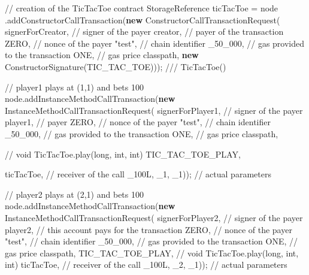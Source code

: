 \documentclass[a4paper,]{book}
\newenvironment{Shaded}{\begin{snugshade}}{\end{snugshade}}
\newcommand{\CommentTok}[1]{\textcolor[rgb]{0.54,0.53,0.53}{#1}}
\newcommand{\DecValTok}[1]{\textcolor[rgb]{0.69,0.50,0.00}{#1}}
\newcommand{\FunctionTok}[1]{\textcolor[rgb]{0.39,0.29,0.61}{#1}}
\newcommand{\KeywordTok}[1]{\textcolor[rgb]{0.12,0.11,0.11}{\textbf{#1}}}
\newcommand{\NormalTok}[1]{\textcolor[rgb]{0.12,0.11,0.11}{#1}}
\newcommand{\StringTok}[1]{\textcolor[rgb]{0.75,0.01,0.01}{#1}}
\renewenvironment{Shaded}{\begin{snugshade}\small}{\end{snugshade}}
\begin{document}
{\begin{Shaded}
\begin{Highlighting}[]
      \CommentTok{// creation of the TicTacToe contract}
\NormalTok{      StorageReference ticTacToe = node}
\NormalTok{        .}\FunctionTok{addConstructorCallTransaction}\NormalTok{(}\KeywordTok{new} \FunctionTok{ConstructorCallTransactionRequest}\NormalTok{(}
\NormalTok{          signerForCreator, }\CommentTok{// signer of the payer}
\NormalTok{          creator, }\CommentTok{// payer of the transaction}
\NormalTok{          ZERO, }\CommentTok{// nonce of the payer}
          \StringTok{"test"}\NormalTok{, }\CommentTok{// chain identifier}
\NormalTok{          _}\DecValTok{50_000}\NormalTok{, }\CommentTok{// gas provided to the transaction}
\NormalTok{          ONE, }\CommentTok{// gas price}
\NormalTok{          classpath,}
          \KeywordTok{new} \FunctionTok{ConstructorSignature}\NormalTok{(TIC_TAC_TOE))); }\CommentTok{/// TicTacToe()}

      \CommentTok{// player1 plays at (1,1) and bets 100}
\NormalTok{      node.}\FunctionTok{addInstanceMethodCallTransaction}\NormalTok{(}\KeywordTok{new} \FunctionTok{InstanceMethodCallTransactionRequest}\NormalTok{(}
\NormalTok{        signerForPlayer1, }\CommentTok{// signer of the payer}
\NormalTok{        player1, }\CommentTok{// payer}
\NormalTok{        ZERO, }\CommentTok{// nonce of the payer}
        \StringTok{"test"}\NormalTok{, }\CommentTok{// chain identifier}
\NormalTok{        _}\DecValTok{50_000}\NormalTok{, }\CommentTok{// gas provided to the transaction}
\NormalTok{        ONE, }\CommentTok{// gas price}
\NormalTok{        classpath,}

        \CommentTok{// void TicTacToe.play(long, int, int)}
\NormalTok{        TIC_TAC_TOE_PLAY,}

\NormalTok{        ticTacToe, }\CommentTok{// receiver of the call}
\NormalTok{        _}\DecValTok{100L}\NormalTok{, _}\DecValTok{1}\NormalTok{, _}\DecValTok{1}\NormalTok{)); }\CommentTok{// actual parameters}

      \CommentTok{// player2 plays at (2,1) and bets 100}
\NormalTok{      node.}\FunctionTok{addInstanceMethodCallTransaction}\NormalTok{(}\KeywordTok{new} \FunctionTok{InstanceMethodCallTransactionRequest}\NormalTok{(}
\NormalTok{        signerForPlayer2, }\CommentTok{// signer of the payer}
\NormalTok{        player2, }\CommentTok{// this account pays for the transaction}
\NormalTok{        ZERO, }\CommentTok{// nonce of the payer}
        \StringTok{"test"}\NormalTok{, }\CommentTok{// chain identifier}
\NormalTok{        _}\DecValTok{50_000}\NormalTok{, }\CommentTok{// gas provided to the transaction}
\NormalTok{        ONE, }\CommentTok{// gas price}
\NormalTok{        classpath,}
\NormalTok{        TIC_TAC_TOE_PLAY, }\CommentTok{// void TicTacToe.play(long, int, int)}
\NormalTok{        ticTacToe, }\CommentTok{// receiver of the call}
\NormalTok{        _}\DecValTok{100L}\NormalTok{, _}\DecValTok{2}\NormalTok{, _}\DecValTok{1}\NormalTok{)); }\CommentTok{// actual parameters}


\end{Highlighting}
\end{Shaded}}
\end{document}
